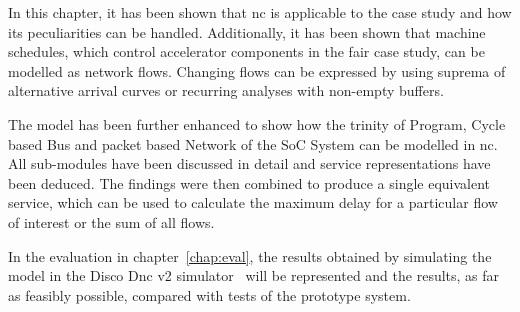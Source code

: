 In this chapter, it has been shown that \gls{nc} is applicable to the case study and how its peculiarities can be handled.
Additionally, it has been shown that machine schedules, which control accelerator components in the \gls{fair} case study, can be modelled as network flows.
Changing flows can be expressed by using suprema of alternative arrival curves or recurring analyses with non-empty buffers.
\par
The model has been further enhanced to show how the trinity of Program, Cycle based Bus and packet based Network of the SoC System can be modelled in \gls{nc}.
All sub-modules have been discussed in detail and service representations have been deduced. The findings were then combined
to produce a single equivalent service, which can be used to calculate the maximum delay for a particular flow of interest or the sum of all flows.
\par
In the evaluation in chapter~\ref{chap:eval}, the results obtained by simulating the model in the Disco D\gls{nc} v2 simulator~\cite{bondorf_discodnc_2014} will be represented and the
results, as far as feasibly possible, compared with tests of the prototype system.
